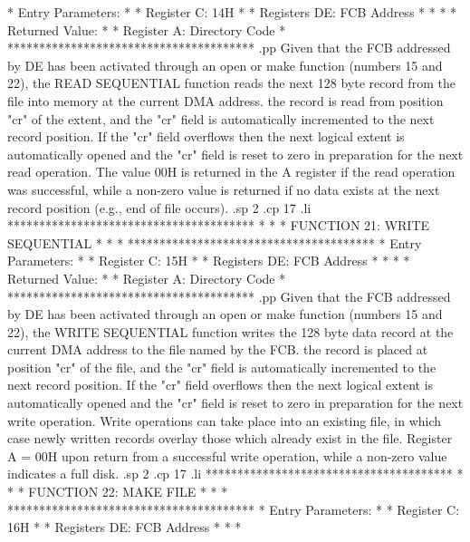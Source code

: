*  Entry Parameters:                  *
*      Register   C:  14H             *
*      Registers DE:  FCB Address     *
*                                     *
*  Returned   Value:                  *
*      Register   A:  Directory Code  *
***************************************
.pp
Given that the FCB addressed by DE has been activated
through an open or make function (numbers 15 and 22), the
READ SEQUENTIAL function reads the next 128 byte record
from the file into memory at the current DMA address.
the record is read from position "cr" of the extent, and
the "cr" field is automatically incremented to the next
record position.  If the "cr" field overflows
then the next logical extent is automatically opened and the
"cr" field is reset to zero in preparation for the next
read operation.
The value 00H is returned in the A register if the read
operation was successful, while a non-zero value is returned
if no data exists at the next record position (e.g., end of
file occurs).
.sp 2
.cp 17
.li
***************************************
*                                     *
*  FUNCTION 21: WRITE SEQUENTIAL      *
*                                     *
***************************************
*  Entry Parameters:                  *
*      Register   C:  15H             *
*      Registers DE:  FCB Address     *
*                                     *
*  Returned   Value:                  *
*      Register   A:  Directory Code  *
***************************************
.pp
Given that the FCB addressed by DE has been activated
through an open or make function (numbers 15 and 22), the
WRITE SEQUENTIAL function writes the 128 byte data record
at the current DMA address to the file named by the FCB.
the record is placed at position "cr" of the file, and
the "cr" field is automatically incremented to the next
record position.  If the "cr" field overflows
then the next logical extent is automatically opened and the
"cr" field is reset to zero in preparation for the next
write operation.  Write operations can take place into an
existing file, in which case newly written records overlay
those which already exist in the file.
Register A = 00H upon return from a successful write operation,
while a non-zero value indicates
a full disk.
.sp 2
.cp 17
.li
***************************************
*                                     *
*  FUNCTION 22: MAKE FILE             *
*                                     *
***************************************
*  Entry Parameters:                  *
*      Register   C:  16H             *
*      Registers DE:  FCB Address     *
*                                     *
